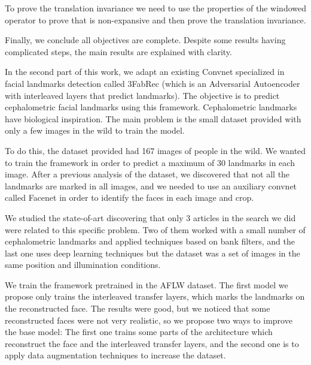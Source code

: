 \medskip

\noindent To prove the translation invariance we need to use the properties of the windowed operator to prove that is non-expansive and then prove the translation invariance.

\medskip

\noindent Finally, we conclude all objectives are complete. Despite some results having complicated steps, the main results are explained with clarity.

\medskip

\noindent In the second part of this work, we adapt an existing Convnet specialized in facial landmarks detection called 3FabRec (which is an Adversarial Autoencoder with interleaved layers that predict landmarks). The objective is to predict cephalometric facial landmarks using this framework. Cephalometric landmarks have biological inspiration. The main problem is the small dataset provided with only a few images in the wild to train the model.

\medskip

\noindent To do this, the dataset provided had 167 images of people in the wild. We wanted to train the framework in order to predict a maximum of $30$ landmarks in each image. After a previous analysis of the dataset, we discovered that not all the landmarks are marked in all images, and we needed to use an auxiliary convnet called Facenet in order to identify the faces in each image and crop.

\medskip

\noindent We studied the state-of-art discovering that only 3 articles in the search we did were related to this specific problem. Two of them worked with a small number of cephalometric landmarks and applied techniques based on bank filters, and the last one uses deep learning techniques but the dataset was a set of images in the same position and illumination conditions. 

\medskip

\noindent We train the framework pretrained in the AFLW dataset. The first model we propose only trains the interleaved transfer layers, which marks the landmarks on the reconstructed face. The results were good, but we noticed that some reconstructed faces were not very realistic, so we propose two ways to improve the base model: The first one trains some parts of the architecture which reconstruct the face and the interleaved transfer layers, and the second one is to apply data augmentation techniques to increase the dataset.

